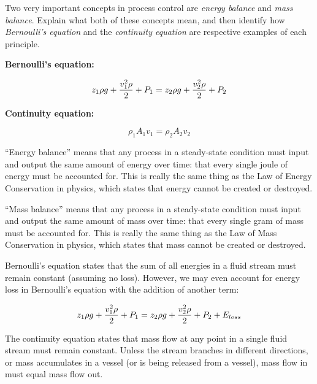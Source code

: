 

Two very important concepts in process control are {\it energy balance} and {\it mass balance}.  Explain what both of these concepts mean, and then identify how {\it Bernoulli's equation} and the {\it continuity equation} are respective examples of each principle.

\vskip 30pt

\noindent
{\bf Bernoulli's equation:}

$$z_1 \rho g + {v_1^2 \rho \over 2} + P_1 = z_2 \rho g + {v_2^2 \rho \over 2} + P_2$$

\vskip 30pt

\noindent
{\bf Continuity equation:}

$$\rho_1 A_1 v_1 = \rho_2 A_2 v_2$$







``Energy balance'' means that any process in a steady-state condition must input and output the same amount of energy over time: that every single joule of energy must be accounted for.  This is really the same thing as the Law of Energy Conservation in physics, which states that energy cannot be created or destroyed.

\vskip 10pt

``Mass balance'' means that any process in a steady-state condition must input and output the same amount of mass over time: that every single gram of mass must be accounted for.  This is really the same thing as the Law of Mass Conservation in physics, which states that mass cannot be created or destroyed.







Bernoulli's equation states that the sum of all energies in a fluid stream must remain constant (assuming no loss).  However, we may even account for energy loss in Bernoulli's equation with the addition of another term:

$$z_1 \rho g + {v_1^2 \rho \over 2} + P_1 = z_2 \rho g + {v_2^2 \rho \over 2} + P_2 + E_{loss}$$

\vskip 10pt

The continuity equation states that mass flow at any point in a single fluid stream must remain constant.  Unless the stream branches in different directions, or mass accumulates in a vessel (or is being released from a vessel), mass flow in must equal mass flow out.




